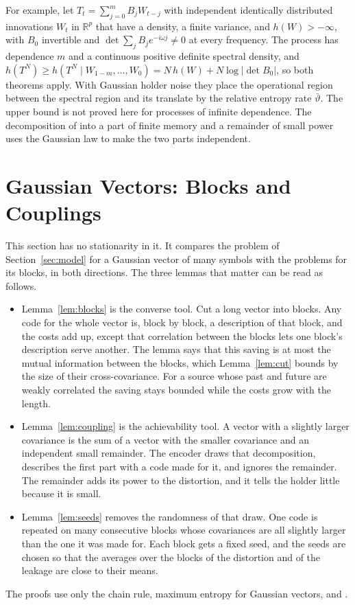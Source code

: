\documentclass[11pt,onecolumn]{IEEEtran}
\newcommand{\R}{\mathbb{R}}
\begin{document}
For example, let $T_t=\sum_{j=0}^mB_jW_{t-j}$ with independent
identically distributed innovations $W_t$ in $\R^p$ that have a
density, a finite variance, and $h(W)>-\infty$, with $B_0$ invertible
and $\det\sum_jB_je^{-i\omega j}\ne0$ at every frequency. The process has
dependence $m$ and a continuous positive definite spectral density,
and $h(T^N)\ge h(T^N\mid W_{1-m},\dots,W_0)=N\,h(W)+N\log|\det B_0|$, so
both theorems apply. With Gaussian holder noise they place the
operational region between the spectral region and its translate by
the relative entropy rate $\bar\vartheta$. The upper bound is not
proved here for processes of infinite dependence. The decomposition
of \cite[Theorem~16]{part2} into a part of finite memory and a
remainder of small power uses the Gaussian law to make the two parts
independent.

\section{Gaussian Vectors: Blocks and Couplings}
\label{sec:tools}

This section has no stationarity in it. It compares the problem of
Section~\ref{sec:model} for a Gaussian vector of many symbols with the
problems for its blocks, in both directions. The three lemmas that
matter can be read as follows.
\begin{itemize}
\item Lemma~\ref{lem:blocks} is the converse tool. Cut a long vector
into blocks. Any code for the whole vector is, block by block, a
description of that block, and the costs add up, except that
correlation between the blocks lets one block's description serve
another. The lemma says that this saving is at most the mutual
information between the blocks, which Lemma~\ref{lem:cut} bounds by the
size of their cross-covariance. For a source whose past and future are
weakly correlated the saving stays bounded while the costs grow with
the length.
\item Lemma~\ref{lem:coupling} is the achievability tool. A vector with
a slightly larger covariance is the sum of a vector with the smaller
covariance and an independent small remainder. The encoder draws that
decomposition, describes the first part with a code made for it, and
ignores the remainder. The remainder adds its power to the distortion,
and it tells the holder little because it is small.
\item Lemma~\ref{lem:seeds} removes the randomness of that draw. One code
is repeated on many consecutive blocks whose covariances are all
slightly larger than the one it was made for. Each block gets a fixed
seed, and the seeds are chosen so that the averages over the blocks of
the distortion and of the leakage are close to their means.
\end{itemize}
The proofs use only the chain rule, maximum entropy for Gaussian
vectors, and \cite[Proposition~2]{part1}.
\end{document}
